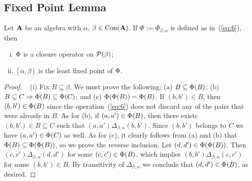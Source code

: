 \subsection{Fixed Point Lemma}
\label{sec:fixed-point-lemma}
\begin{lem}
  Let $\mathbf{A}$ be an algebra with $\alpha$, $\beta\in \operatorname{Con}(\mathbf{A})$.
  If $\Phi:=\Phi_{\beta, \alpha}$ is defined as in~(\ref{eq:6}), then 
  \begin{enumerate}[(i)]
  \item \label{item:001} $\Phi$ is a closure operator on $\mathcal{P}(\beta)$;
  \item \label{item:002} $[\alpha, \beta]$ is the least fixed point of $\Phi$.
  \end{enumerate}
\end{lem}
\begin{proof}\
\noindent (i) Fix $B \subseteq \beta$. We must prove the following:
    (a) $B \subseteq \Phi(B)$;    
    (b) $B \subseteq C  \Rightarrow \Phi(B) \subseteq \Phi(C)$;    
    and (c) $\Phi(\Phi(B))  = \Phi(B)$.    
    If $(b,b') \in B$, then $(b,b') \in \Phi(B)$ since the
    operation~(\ref{eq:6}) does not discard any of the pairs that were already in $B$.
    As for (b), if $(a,a') \in \Phi(B)$, then there exists
    $(b,b') \in B \subseteq C$ such that $(a,a') \mathrel{\Delta_{\beta, \alpha}} (b,b')$.
    Since $(b,b')$ belongs to $C$ we have $(a,a') \in \Phi(C)$ as well.
    As for (c), it clearly follows from
    (a) and (b) that $\Phi(B)\subseteq \Phi(\Phi(B))$, so we prove the
    reverse inclusion.    
    Let $(d,d') \in \Phi(\Phi(B))$. Then
    $(c,c') \mathrel{\Delta_{\beta, \alpha}} (d,d')$ for some
    $(c,c') \in \Phi(B)$, which implies
    $(b,b') \mathrel{\Delta_{\beta, \alpha}} (c,c')$ for some
    $(b,b') \in B$.  By transitivity of $\Delta_{\beta, \alpha}$ we conclude that
    $(d,d') \in \Phi(B)$, as desired.
    \bigskip


\end{proof}
